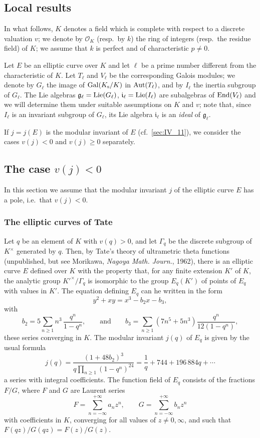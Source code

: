 \begin{subappendices}

\section{Local results}
\dpage
In what follows, $K$ denotes a field which is complete with respect to a
discrete valuation $v$; we denote by $\mathcal{O}_K$ (resp.\ by $k$) the ring
of integers (resp.\ the residue field) of $K$; we assume that $k$ is perfect
and of characteristic $p \ne 0$.

Let $E$ be an elliptic curve over $K$ and let $\ell$ be a prime number
different from the characteristic of $K$. Let $T_\ell$ and $V_\ell$ be the
corresponding Galois modules; we denote by $G_\ell$ the image of $\operatorname{Gal}(K_{\mathrm{s}}/K)$ in $\operatorname{Aut}(T_\ell)$, and by $I_\ell$ the inertia subgroup of $G_\ell$. The
Lie algebras $\mathfrak{g}_\ell = \operatorname{Lie}(G_\ell)$, $\mathfrak{i}_\ell =
\operatorname{Lie}(I_\ell)$ are subalgebras of $\operatorname{End}(V_\ell)$ and we will determine them
under suitable assumptions on $K$ and $v$; note that, since $I_\ell$ is an
invariant subgroup of $G_\ell$, its Lie algebra $\mathfrak{i}_\ell$ is an
\emph{ideal} of $\mathfrak{g}_\ell$.

If $j = j(E)$ is the modular invariant of $E$ (cf.\ \ref{sec:IV_11}), we
consider the cases $v(j) < 0$ and $v(j) \ge 0$ separately.

\subsection{The case $v(j) < 0$}
\label{sec:IV_A1}
In this section we assume that the modular invariant $j$ of the elliptic curve
$E$ has a pole, i.e.\ that $v(j) < 0$.

\subsubsection{The elliptic curves of Tate}
\label{sec:IV_A11}
Let $q$ be an element of $K$ with $v(q) > 0$, and let $\Gamma_q$ be the
discrete subgroup of $K^\times$ generated by $q$. Then, by Tate's theory of
ultrametric theta functions (unpublished, but see Morikawa, \emph{Nagoya Math.
Journ.}, 1962),
\dpage
there is an elliptic curve $E$ defined over $K$ with the property that, for any
finite extension $K'$ of $K$, the analytic group ${K'}^\times / \Gamma_q$ is
isomorphic to the group $E_q(K')$ of points of $E_q$ with values in $K'$. The
equation defining $E_q$ can he written in the form
\[
	y^2 + xy = x^3 - b_2x - b_3,
\]
with
\[
	b_2 = 5 \sum_{n\ge 1} n^3 \, \frac{q^n}{1-q^n}, \qquad \text{and}
	\qquad b_3 = \sum_{n\ge 1} (7n^5 + 5n^3) \frac{q^n}{12(1-q^n)},
\]
these series converging in $K$. The modular invariant $j(q)$ of $E_q$ is
given by the usual formula
\[
	j(q) = \frac{(1 + 48b_2)^3}{q \prod_{n\ge 1} (1 - q^n)^{24}}
	= \frac{1}{q} + 744 + 196\,884 q + \cdots
\]
a series with integral coefficients. The function field of $E_q$ consists
of the fractions $F/G$, where $F$ and $G$ are Laurent series
\[
	F = \sum_{n=-\infty}^{+\infty} a_n z^n, \qquad
	G = \sum_{n=-\infty}^{+\infty} b_n z^n
\]
with coefficients in $K$, converging for all values of $z \ne 0, \infty$, and
such that $F(qz)/G(qz) = F(z)/G(z)$.


\end{subappendices}

